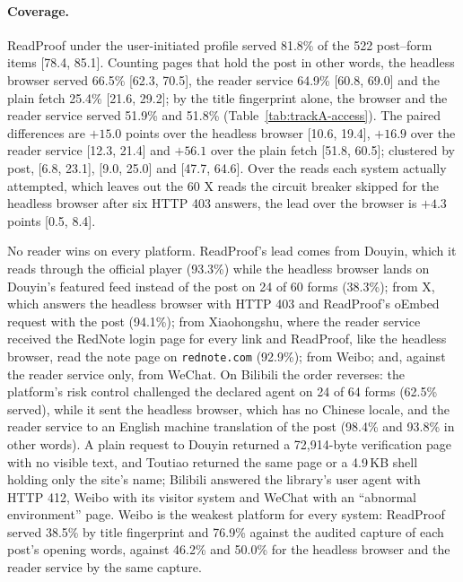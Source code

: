 

\paragraph{Coverage.}
ReadProof under the user-initiated profile served 81.8\% of the 522 post--form items [78.4, 85.1]. Counting pages
that hold the post in other words, the headless browser served 66.5\% [62.3, 70.5], the reader service 64.9\%
[60.8, 69.0] and the plain fetch 25.4\% [21.6, 29.2]; by the title fingerprint alone, the browser and the reader
service served 51.9\% and 51.8\% (Table~\ref{tab:trackA-access}). The paired differences are $+15.0$ points over the
headless browser [10.6, 19.4], $+16.9$ over the reader service [12.3, 21.4] and $+56.1$ over the plain fetch [51.8,
60.5]; clustered by post, [6.8, 23.1], [9.0, 25.0] and [47.7, 64.6]. Over the reads each system actually attempted,
which leaves out the 60 X reads the circuit breaker skipped for the headless browser after six HTTP 403 answers, the
lead over the browser is $+4.3$ points [0.5, 8.4].

No reader wins on every platform. ReadProof's lead comes from Douyin, which it reads through the official player
(93.3\%) while the headless browser lands on Douyin's featured feed instead of the post on 24 of 60 forms (38.3\%);
from X, which answers the headless browser with HTTP 403 and ReadProof's oEmbed request with the post (94.1\%); from
Xiaohongshu, where the reader service received the RedNote login page for every link and ReadProof, like the headless
browser, read the note page on \texttt{rednote.com} (92.9\%); from Weibo; and, against the reader service only,
from WeChat. On Bilibili the order
reverses: the platform's risk control challenged the declared agent on 24 of 64 forms (62.5\% served), while it
sent the headless browser, which has no Chinese locale, and the reader service to an English machine translation of
the post (98.4\% and 93.8\% in other words). A plain request to Douyin returned a 72{,}914-byte verification page with
no visible text, and Toutiao returned the same page or a 4.9\,KB shell holding only the site's name; Bilibili
answered the library's user agent with HTTP 412, Weibo with its visitor system and WeChat with an ``abnormal
environment'' page. Weibo is the weakest platform for every system: ReadProof served 38.5\% by title fingerprint and
76.9\% against the audited capture of each post's opening words, against 46.2\% and 50.0\% for the headless browser
and the reader service by the same capture.

